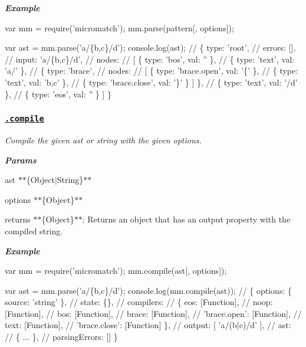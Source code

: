 {\itshape {\bfseries Example}}

{\itshape 
\begin{DoxyCode}
var mm = require('micromatch');
mm.parse(pattern[, options]);

var ast = mm.parse('a/\{b,c\}/d');
console.log(ast);
// \{ type: 'root',
//   errors: [],
//   input: 'a/\{b,c\}/d',
//   nodes:
//    [ \{ type: 'bos', val: '' \},
//      \{ type: 'text', val: 'a/' \},
//      \{ type: 'brace',
//        nodes:
//         [ \{ type: 'brace.open', val: '\{' \},
//           \{ type: 'text', val: 'b,c' \},
//           \{ type: 'brace.close', val: '\}' \} ] \},
//      \{ type: 'text', val: '/d' \},
//      \{ type: 'eos', val: '' \} ] \}
\end{DoxyCode}
}

{\itshape \subsubsection*{\href{index.js#L780}{\tt .compile}}}

{\itshape }

{\itshape Compile the given {\ttfamily ast} or string with the given {\ttfamily options}.}

{\itshape {\bfseries Params}}

{\itshape 
\begin{DoxyItemize}
\item {\ttfamily ast} $\ast$$\ast$\{Object$\vert$\+String\}$\ast$$\ast$
\item {\ttfamily options} $\ast$$\ast$\{Object\}$\ast$$\ast$
\item {\ttfamily returns} $\ast$$\ast$\{Object\}$\ast$$\ast$\+: Returns an object that has an {\ttfamily output} property with the compiled string.
\end{DoxyItemize}}

{\itshape {\bfseries Example}}

{\itshape 
\begin{DoxyCode}
var mm = require('micromatch');
mm.compile(ast[, options]);

var ast = mm.parse('a/\{b,c\}/d');
console.log(mm.compile(ast));
// \{ options: \{ source: 'string' \},
//   state: \{\},
//   compilers:
//    \{ eos: [Function],
//      noop: [Function],
//      bos: [Function],
//      brace: [Function],
//      'brace.open': [Function],
//      text: [Function],
//      'brace.close': [Function] \},
//   output: [ 'a/(b|c)/d' ],
//   ast:
//    \{ ... \},
//   parsingErrors: [] \}
\end{DoxyCode}
}

